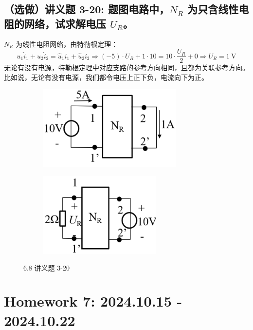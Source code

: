 \documentclass[UTF8]{report}
\theoremstyle{MyLineTheoremStyle} %
\theoremstyle{MyBlockTheoremStyle} %
\theoremstyle{MySubsubsectionStyle} %
\begin{document}
\section{（选做）讲义题 3-20: 题图电路中，$N_R$ 为只含线性电阻的网络，试求解电压 $U_R$。}

$N_R$ 为线性电阻网络，由特勒根定理：
\begin{equation}
    u_1\hat{i}_1 + u_2 \hat{i}_2 = \hat{u}_1i_1 + \hat{u}_2 i_2 \Longrightarrow 
    (-5)\cdot U_R + 1\cdot 10 = 10\cdot \frac{U_R}{2} + 0\Longrightarrow \boxed{
        U_R = 1 \ \mathrm{V}
    }
\end{equation}
无论有没有电源，特勒根定理中对应支路的参考方向相同，且都为关联参考方向。比如说，无论有没有电源，我们都令电压上正下负，电流向下为正。

\begin{figure}[H]\centering
\begin{subfigure}[t]{0.5\columnwidth}\centering
    \includegraphics[height=120pt]{assets/6/940731df99ca203c28371281cebfb9ca.png}
\end{subfigure}\hfill
\begin{subfigure}[t]{0.5\columnwidth}\centering
    \includegraphics[height=120pt]{assets/6/7c27b6b5231748eb023412fd0cbe700c.png}
\end{subfigure}
\caption{ 6.8 讲义题 3-20 }
\end{figure}


\chapter{Homework 7: 2024.10.15 - 2024.10.22}
\thispagestyle{fancy}
\end{document}
